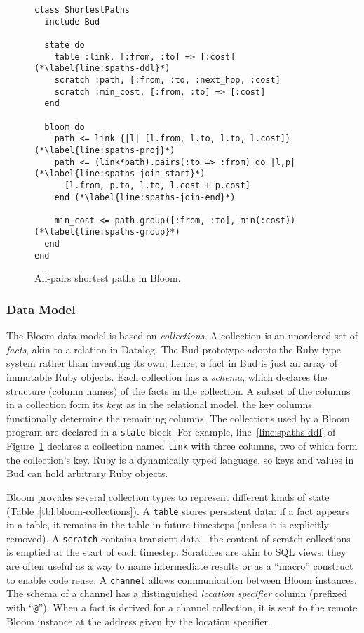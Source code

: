 \begin{figure}[t]
\begin{scriptsize}
\begin{lstlisting}
class ShortestPaths
  include Bud

  state do
    table :link, [:from, :to] => [:cost] (*\label{line:spaths-ddl}*)
    scratch :path, [:from, :to, :next_hop, :cost]
    scratch :min_cost, [:from, :to] => [:cost]
  end

  bloom do
    path <= link {|l| [l.from, l.to, l.to, l.cost]} (*\label{line:spaths-proj}*)
    path <= (link*path).pairs(:to => :from) do |l,p| (*\label{line:spaths-join-start}*)
      [l.from, p.to, l.to, l.cost + p.cost]
    end (*\label{line:spaths-join-end}*)

    min_cost <= path.group([:from, :to], min(:cost)) (*\label{line:spaths-group}*)
  end
end
\end{lstlisting}
\end{scriptsize}
\caption{All-pairs shortest paths in Bloom.}
\label{fig:bloom-spaths}
\end{figure}

\subsubsection{Data Model}
The Bloom data model is based on \emph{collections}.  A collection is an
unordered set of \emph{facts}, akin to a relation in Datalog. The Bud prototype
adopts the Ruby type system rather than inventing its own; hence, a fact in Bud
is just an array of immutable Ruby objects. Each collection has a \emph{schema},
which declares the structure (column names) of the facts in the collection. A
subset of the columns in a collection form its \emph{key}: as in the relational
model, the key columns functionally determine the remaining columns. The
collections used by a Bloom program are declared in a \texttt{state} block. For
example, line~\ref{line:spaths-ddl} of Figure~\ref{fig:bloom-spaths} declares a
collection named \texttt{link} with three columns, two of which form the
collection's key. Ruby is a dynamically typed language, so keys and values in
Bud can hold arbitrary Ruby objects.

Bloom provides several collection types to represent different kinds of state
(Table~\ref{tbl:bloom-collections}). A \texttt{table} stores persistent data: if
a fact appears in a table, it remains in the table in future timesteps (unless
it is explicitly removed). A \texttt{scratch} contains transient data---the
content of scratch collections is emptied at the start of each
timestep. Scratches are akin to SQL views: they are often useful as a way to
name intermediate results or as a ``macro'' construct to enable code reuse. A
\texttt{channel} allows communication between Bloom instances. The schema of a
channel has a distinguished \emph{location specifier} column (prefixed with
``\texttt{@}''). When a fact is derived for a channel collection, it is sent to
the remote Bloom instance at the address given by the location specifier.

